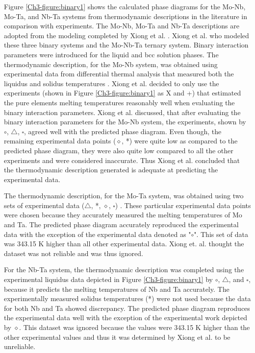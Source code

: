 Figure \ref{Ch3-figure:binary1} shows the calculated phase diagrams for the Mo-Nb, Mo-Ta, and Nb-Ta systems from thermodynamic descriptions in the literature in comparison with experiments. The Mo-Nb, Mo-Ta and Nb-Ta descriptions are adopted from the modeling completed by Xiong et al. \cite{Xiong2004}. Xiong et al. \cite{Xiong2004} who modeled these three binary systems and the Mo-Nb-Ta ternary system. Binary interaction parameters were introduced for the liquid and bcc solution phases. The thermodynamic description, for the Mo-Nb system, was obtained using experimental data from differential thermal analysis that measured both the liquidus and solidus temperatures \cite{Xiong2004}. Xiong et al. \cite{Xiong2004} decided to only use the experiments (shown in Figure \ref{Ch3-figure:binary1} as X and +) that estimated the pure elements melting temperatures reasonably well when evaluating the binary interaction parameters. Xiong et al. \cite{Xiong2004} discussed, that after evaluating the binary interaction parameters for the Mo-Nb system, the experiments, shown by $\circ$, $\bigtriangleup$, $\square$, agreed well with the predicted phase diagram. Even though, the remaining experimental data points ($\diamond$, *) were quite low as compared to the predicted phase diagram, they were also quite low compared to all the other experiments \cite{Xiong2004} and were considered inaccurate. Thus Xiong et al. \cite{Xiong2004} concluded that the thermodynamic description generated is adequate at predicting the experimental data. 

The thermodynamic description, for the Mo-Ta system, was obtained using two sets of experimental data ($\bigtriangleup$, *, $\diamond$, $\square$) \cite{Xiong2004}. These particular experimental data points were chosen because they accurately measured the melting temperatures of Mo and Ta. The predicted phase diagram accurately reproduced the experimental data with the exception of the experimental data \cite{Xiong2004} denoted as "$\circ$". This set of data was 343.15 K higher than all other experimental data. Xiong et. al. \cite{Xiong2004} thought the dataset was not reliable and was thus ignored. 

For the Nb-Ta system, the thermodynamic description was completed using the experimental liquidus data \cite{Xiong2004} depicted in Figure \ref{Ch3-figure:binary1} by $\circ$, $\bigtriangleup$, and $\square$, because it predicts the melting temperatures of Nb and Ta accurately. The experimentally measured solidus temperatures (*) were not used because the data for both Nb and Ta showed discrepancy. The predicted phase diagram reproduces the experimental data well with the exception of the experimental work depicted by $\diamond$. This dataset was ignored because the values were 343.15 K higher than the other experimental values and thus it was determined by Xiong et al. \cite{Xiong2004} to be unreliable. 

